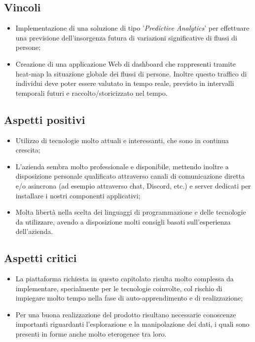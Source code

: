 \subsection{Vincoli}{
\begin{itemize}
\item Implementazione di una soluzione di tipo '\textit{Predictive Analytics}' per effettuare una previsione dell'insorgenza futura di variazioni significative di flussi di persone;
\item Creazione di una applicazione Web di dashboard che rappresenti tramite heat-map la situazione globale dei flussi di persone. Inoltre questo traffico di individui deve poter essere valutato in tempo reale, previsto in intervalli temporali futuri e raccolto/storicizzato nel tempo.
\end{itemize}
}

\subsection{Aspetti positivi}{
\begin{itemize}
\item Utilizzo di tecnologie molto attuali e interessanti, che sono in continua crescita;
\item L'azienda sembra molto professionale e disponibile, mettendo inoltre a disposizione personale qualificato attraverso canali di comunicazione diretta e/o asincrona (ad esempio attraverso chat, Discord, etc.) e server dedicati per installare i nostri componenti applicativi;
\item Molta libertà nella scelta dei linguaggi di programmazione e delle tecnologie da utilizzare, avendo a disposizione molti consigli basati sull'esperienza dell'azienda.
\end{itemize}
}

\subsection{Aspetti critici}{
\begin{itemize}
\item La piattaforma richiesta in questo capitolato risulta molto complessa da implementare, specialmente per le tecnologie coinvolte, col rischio di impiegare molto tempo nella fase di auto-apprendimento e di realizzazione;
\item Per una buona realizzazione del prodotto risultano necessarie conoscenze importanti riguardanti l'esplorazione e la manipolazione dei dati, i quali sono presenti in forme anche molto eterogenee tra loro.
\end{itemize}
}

